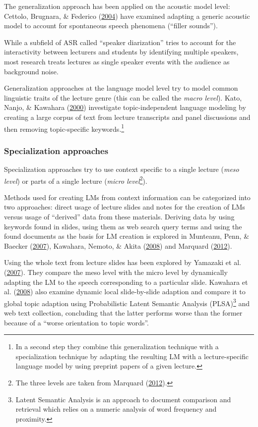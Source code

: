 \documentclass[]{article}
\begin{document}
The generalization approach has been applied on the acoustic model
level: Cettolo, Brugnara, \& Federico (\hyperref[ref-cettolo]{2004})
have examined adapting a generic acoustic model to account for
spontaneous speech phenomena (``filler sounds'').

While a subfield of ASR called ``speaker diarization'' tries to account
for the interactivity between lecturers and students by identifying
multiple speakers, most research treats lectures as single speaker
events with the audience as background noise.

Generalization approaches at the language model level try to model
common linguistic traits of the lecture genre (this can be called the
\emph{macro level}). Kato, Nanjo, \& Kawahara
(\hyperref[ref-kato2000]{2000}) investigate topic-independent language
modeling by creating a large corpus of text from lecture transcripts and
panel discussions and then removing topic-specific keywords.\footnote{In
  a second step they combine this generalization technique with a
  specialization technique by adapting the resulting LM with a
  lecture-specific language model by using preprint papers of a given
  lecture.}

\subsubsection{Specialization
approaches}\label{specialization-approaches}

Specialization approaches try to use context specific to a single
lecture (\emph{meso level}) or parts of a single lecture (\emph{micro
level}\footnote{The three levels are taken from Marquard
  (\hyperref[ref-marquard]{2012}).}).

Methods used for creating LMs from context information can be
categorized into two approaches: direct usage of lecture slides and
notes for the creation of LMs versus usage of ``derived'' data from
these materials. Deriving data by using keywords found in slides, using
them as web search query terms and using the found documents as the
basis for LM creation is explored in Munteanu, Penn, \& Baecker
(\hyperref[ref-munteanu]{2007}), Kawahara, Nemoto, \& Akita
(\hyperref[ref-kawahara08]{2008}) and Marquard
(\hyperref[ref-marquard]{2012}).

Using the whole text from lecture slides has been explored by Yamazaki
et al. (\hyperref[ref-yamazaki]{2007}). They compare the meso level with
the micro level by dynamically adapting the LM to the speech
corresponding to a particular slide. Kawahara et al.
(\hyperref[ref-kawahara08]{2008}) also examine dynamic local
slide-by-slide adaption and compare it to global topic adaption using
Probabilistic Latent Semantic Analysis (PLSA)\footnote{Latent Semantic
  Analysis is an approach to document comparison and retrieval which
  relies on a numeric analysis of word frequency and proximity. } and
web text collection, concluding that the latter performs worse than the
former because of a ``worse orientation to topic words''.
\end{document}
